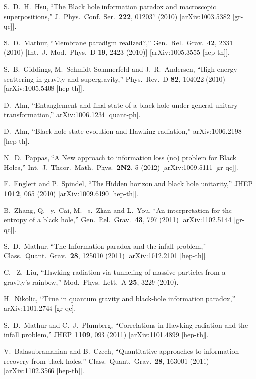 \documentclass[12pt]{article}
\begin{document}
\begin{thebibliography}{99}
  S.~D.~H.~Hsu,
  ``The Black hole information paradox and macroscopic superpositions,''
  J.\ Phys.\ Conf.\ Ser.\  {\bf 222}, 012037 (2010)
  [arXiv:1003.5382 [gr-qc]].

  S.~D.~Mathur,
  ``Membrane paradigm realized?,''
  Gen.\ Rel.\ Grav.\  {\bf 42}, 2331 (2010)
  [Int.\ J.\ Mod.\ Phys.\ D {\bf 19}, 2423 (2010)]
  [arXiv:1005.3555 [hep-th]].

  S.~B.~Giddings, M.~Schmidt-Sommerfeld and J.~R.~Andersen,
  ``High energy scattering in gravity and supergravity,''
  Phys.\ Rev.\ D {\bf 82}, 104022 (2010)
  [arXiv:1005.5408 [hep-th]].

  D.~Ahn,
  ``Entanglement and final state of a black hole under general unitary transformation,''
  arXiv:1006.1234 [quant-ph].

  D.~Ahn,
  ``Black hole state evolution and Hawking radiation,''
  arXiv:1006.2198 [hep-th].

  N.~D.~Pappas,
  ``A New approach to information loss (no) problem for Black Holes,''
  Int.\ J.\ Theor.\ Math.\ Phys.\  {\bf 2N2}, 5 (2012)
  [arXiv:1009.5111 [gr-qc]].

  F.~Englert and P.~Spindel,
  ``The Hidden horizon and black hole unitarity,''
  JHEP {\bf 1012}, 065 (2010)
  [arXiv:1009.6190 [hep-th]].

  B.~Zhang, Q.~-y.~Cai, M.~-s.~Zhan and L.~You,
  ``An interpretation for the entropy of a black hole,''
  Gen.\ Rel.\ Grav.\  {\bf 43}, 797 (2011)
  [arXiv:1102.5144 [gr-qc]].

  S.~D.~Mathur,
  ``The Information paradox and the infall problem,''
  Class.\ Quant.\ Grav.\  {\bf 28}, 125010 (2011)
  [arXiv:1012.2101 [hep-th]].

  C.~-Z.~Liu,
  ``Hawking radiation via tunneling of massive particles from a gravity's rainbow,''
  Mod.\ Phys.\ Lett.\ A {\bf 25}, 3229 (2010).

  H.~Nikolic,
  ``Time in quantum gravity and black-hole information paradox,''
  arXiv:1101.2744 [gr-qc].

  S.~D.~Mathur and C.~J.~Plumberg,
  ``Correlations in Hawking radiation and the infall problem,''
  JHEP {\bf 1109}, 093 (2011)
  [arXiv:1101.4899 [hep-th]].

  V.~Balasubramanian and B.~Czech,
  ``Quantitative approaches to information recovery from black holes,''
  Class.\ Quant.\ Grav.\  {\bf 28}, 163001 (2011)
  [arXiv:1102.3566 [hep-th]].


\end{thebibliography}
\end{document}
